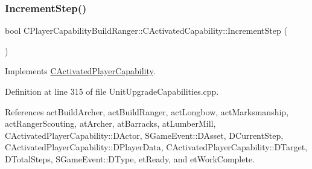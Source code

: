 \hypertarget{classCPlayerCapabilityBuildRanger_1_1CActivatedCapability_a5fd10074c6b25ffb36401055ed90b70b}{}\label{classCPlayerCapabilityBuildRanger_1_1CActivatedCapability_a5fd10074c6b25ffb36401055ed90b70b} 
\subsubsection{\texorpdfstring{Increment\+Step()}{IncrementStep()}}
{\footnotesize\ttfamily bool C\+Player\+Capability\+Build\+Ranger\+::\+C\+Activated\+Capability\+::\+Increment\+Step (\begin{DoxyParamCaption}{ }\end{DoxyParamCaption})\hspace{0.3cm}{\ttfamily [virtual]}}



Implements \hyperlink{classCActivatedPlayerCapability_a943b5999a57504399293250382c0ec6a}{C\+Activated\+Player\+Capability}.



Definition at line 315 of file Unit\+Upgrade\+Capabilities.\+cpp.



References act\+Build\+Archer, act\+Build\+Ranger, act\+Longbow, act\+Marksmanship, act\+Ranger\+Scouting, at\+Archer, at\+Barracks, at\+Lumber\+Mill, C\+Activated\+Player\+Capability\+::\+D\+Actor, S\+Game\+Event\+::\+D\+Asset, D\+Current\+Step, C\+Activated\+Player\+Capability\+::\+D\+Player\+Data, C\+Activated\+Player\+Capability\+::\+D\+Target, D\+Total\+Steps, S\+Game\+Event\+::\+D\+Type, et\+Ready, and et\+Work\+Complete.


